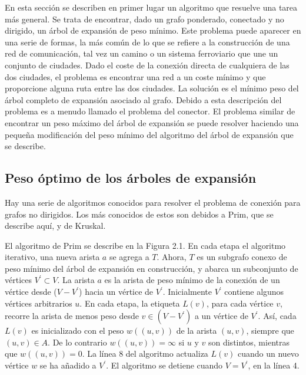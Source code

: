 \documentclass[10pt,a5paper]{book}
\begin{document}
En esta sección se describen en primer lugar un algoritmo que resuelve una tarea más general. Se trata de encontrar, dado un grafo ponderado, conectado y no dirigido, un árbol de expansión de peso mínimo. Este problema puede aparecer en una serie de formas, la más común de lo que se refiere a la construcción de una red de comunicación, tal vez un camino o un sistema ferroviario que une un conjunto de ciudades. Dado el coste de la conexión directa de cualquiera de las dos ciudades, el problema es encontrar una red a un coste mínimo y que proporcione alguna ruta entre las dos ciudades. La solución es el mínimo peso del árbol completo de expansión asociado al grafo. Debido a esta descripción del problema es a menudo llamado el problema del conector. El problema similar de encontrar un peso máximo del árbol de expansión se puede resolver haciendo una pequeña modificación del peso mínimo del algoritmo del árbol de expansión que se describe.

\subsection{Peso óptimo de los árboles de expansión}

Hay una serie de algoritmos conocidos para resolver el problema de conexión para grafos no dirigidos. Los más conocidos de estos son debidos a Prim\cite{d}, que se describe aquí, y de Kruskal.

El algoritmo de Prim se describe en la Figura 2.1. En cada etapa el algoritmo iterativo, una nueva arista $a$ se agrega a $T$. Ahora, $T$ es un subgrafo conexo de peso mínimo del árbol de expansión en construcción, y abarca un subconjunto de vértices $V^{'} \subset V$. La arista $a$ es la arista de peso mínimo de la conexión de un vértice desde ($V - V^{'}$) hacia un vértice de $V^{'}$. Inicialmente $V^{'}$ contiene algunos vértices arbitrarios $u$. En cada etapa, la etiqueta $L(v)$, para cada vértice $v$, recorre la arista de menos peso desde $v \in (V- V^{'})$ a un vértice de $V^{'}$. Así, cada $L(v)$ es inicializado con el peso $w((u,v))$ de la arista $(u,v)$, siempre que $(u,v) \in A$. De lo contrario $w((u,v)) = \infty$ si $u$ y $v$ son distintos, mientras que $w((u,v)) = 0$. La línea 8 del algoritmo actualiza $L(v)$ cuando un nuevo vértice $w$ se ha añadido a $V^{'}$. El algoritmo se detiene cuando $V = V^{'}$, en la línea 4.
\end{document}

